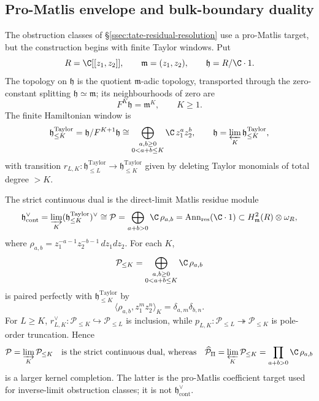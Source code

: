 \documentclass[11pt]{memoir}
\begin{document}


\subsection{Pro-Matlis envelope and bulk-boundary duality}\label{ssec:promatlis-target}

The obstruction classes of \S\ref{ssec:tate-residual-resolution} use a
pro-Matlis target, but the construction begins with finite Taylor
windows.  Put
\[
  R=\C[[z_1,z_2]],\qquad \mathfrak m=(z_1,z_2),\qquad
  \mathfrak h=R/\C\cdot1 .
\]
The topology on \(\mathfrak h\) is the quotient \(\mathfrak m\)-adic
topology, transported through the zero-constant splitting
\(\mathfrak h\simeq\mathfrak m\); its neighbourhoods of zero are
\[
  F^K\mathfrak h=\mathfrak m^K,\qquad K\geq1 .
\]
The finite Hamiltonian window is
\[
  \mathfrak h^{\mathrm{Taylor}}_{\leq K}
    =\mathfrak h/F^{K+1}\mathfrak h
    \cong
    \bigoplus_{\substack{a,b\ge0\\0<a+b\le K}}\C\,z_1^az_2^b,
  \qquad
  \mathfrak h=\varprojlim_K\mathfrak h^{\mathrm{Taylor}}_{\leq K},
\]
with transition
\(r_{L,K}\colon\mathfrak h^{\mathrm{Taylor}}_{\leq L}
\to\mathfrak h^{\mathrm{Taylor}}_{\leq K}\)
given by deleting Taylor monomials of total degree \(>K\).

The strict continuous dual is the direct-limit Matlis residue module
\[
  \mathfrak h^\vee_{\mathrm{cont}}
    =\varinjlim_K(\mathfrak h^{\mathrm{Taylor}}_{\leq K})^{\vee}
    \cong
    \mathcal P
    =
    \bigoplus_{a+b>0}\C\,\rho_{a,b}
    =
    \mathrm{Ann}_{\mathrm{res}}(\C\cdot1)
    \subset H^2_{\mathfrak m}(R)\otimes\omega_R ,
\]
where
\(\rho_{a,b}=z_1^{-a-1}z_2^{-b-1}\,dz_1dz_2\).  For each \(K\),
\[
  \mathcal P_{\le K}
    =
    \bigoplus_{\substack{a,b\ge0\\0<a+b\le K}}\C\,\rho_{a,b}
\]
is paired perfectly with \(\mathfrak h^{\mathrm{Taylor}}_{\le K}\) by
\[
  \langle\rho_{a,b},z_1^mz_2^n\rangle_K
    =\delta_{a,m}\delta_{b,n}.
\]
For \(L\ge K\), \(r_{L,K}^{\vee}\colon\mathcal P_{\le K}\hookrightarrow
\mathcal P_{\le L}\) is inclusion, while
\(p_{L,K}\colon\mathcal P_{\le L}\twoheadrightarrow\mathcal P_{\le K}\)
is pole-order truncation.  Hence
\[
  \mathcal P=\varinjlim_K\mathcal P_{\le K}
  \quad\text{is the strict continuous dual, whereas}\quad
  \widehat{\mathcal P}_\Pi
    =
    \varprojlim_K\mathcal P_{\le K}
    =
    \prod_{a+b>0}\C\,\rho_{a,b}
\]
is a larger kernel completion.  The latter is the pro-Matlis coefficient
target used for inverse-limit obstruction classes; it is not
\(\mathfrak h^\vee_{\mathrm{cont}}\).
\end{document}
